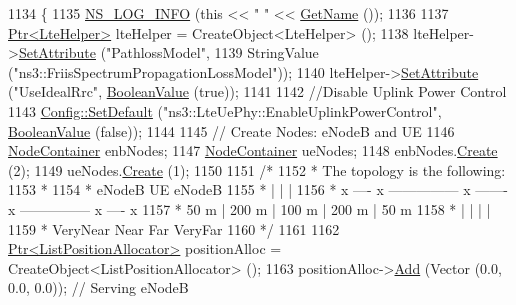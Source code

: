 \begin{DoxyCode}
1134 \{
1135   \hyperlink{group__logging_gafbd73ee2cf9f26b319f49086d8e860fb}{NS\_LOG\_INFO} (\textcolor{keyword}{this} << \textcolor{stringliteral}{" "} << \hyperlink{classns3_1_1TestCase_a28f7bb59669c24dae1c290fc17fc9b62}{GetName} ());
1136 
1137   \hyperlink{classns3_1_1Ptr}{Ptr<LteHelper>} lteHelper = CreateObject<LteHelper> ();
1138   lteHelper->\hyperlink{classns3_1_1ObjectBase_ac60245d3ea4123bbc9b1d391f1f6592f}{SetAttribute} (\textcolor{stringliteral}{"PathlossModel"},
1139                            StringValue (\textcolor{stringliteral}{"ns3::FriisSpectrumPropagationLossModel"}));
1140   lteHelper->\hyperlink{classns3_1_1ObjectBase_ac60245d3ea4123bbc9b1d391f1f6592f}{SetAttribute} (\textcolor{stringliteral}{"UseIdealRrc"}, \hyperlink{classns3_1_1BooleanValue}{BooleanValue} (\textcolor{keyword}{true}));
1141 
1142   \textcolor{comment}{//Disable Uplink Power Control}
1143   \hyperlink{group__config_ga2e7882df849d8ba4aaad31c934c40c06}{Config::SetDefault} (\textcolor{stringliteral}{"ns3::LteUePhy::EnableUplinkPowerControl"}, 
      \hyperlink{classns3_1_1BooleanValue}{BooleanValue} (\textcolor{keyword}{false}));
1144 
1145   \textcolor{comment}{// Create Nodes: eNodeB and UE}
1146   \hyperlink{classns3_1_1NodeContainer}{NodeContainer} enbNodes;
1147   \hyperlink{classns3_1_1NodeContainer}{NodeContainer} ueNodes;
1148   enbNodes.\hyperlink{classns3_1_1NodeContainer_a787f059e2813e8b951cc6914d11dfe69}{Create} (2);
1149   ueNodes.\hyperlink{classns3_1_1NodeContainer_a787f059e2813e8b951cc6914d11dfe69}{Create} (1);
1150 
1151   \textcolor{comment}{/*}
1152 \textcolor{comment}{   * The topology is the following:}
1153 \textcolor{comment}{   *}
1154 \textcolor{comment}{   * eNodeB    UE                                                eNodeB}
1155 \textcolor{comment}{   *    |      |                                                    |}
1156 \textcolor{comment}{   *    x ---- x --------------- x ------- x --------------- x ---- x}
1157 \textcolor{comment}{   *      50 m |      200 m      |  100 m  |      200 m      | 50 m}
1158 \textcolor{comment}{   *           |                 |         |                 |}
1159 \textcolor{comment}{   *        VeryNear            Near      Far             VeryFar}
1160 \textcolor{comment}{   */}
1161 
1162   \hyperlink{classns3_1_1Ptr}{Ptr<ListPositionAllocator>} positionAlloc = CreateObject<ListPositionAllocator> 
      ();
1163   positionAlloc->\hyperlink{classns3_1_1ListPositionAllocator_a460e82f015ac012a73ba0ea0cccb3486}{Add} (Vector (0.0, 0.0, 0.0)); \textcolor{comment}{// Serving eNodeB}

\end{DoxyCode}

